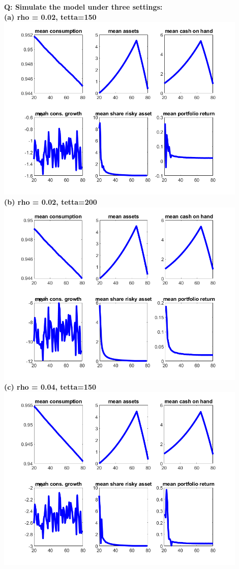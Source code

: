 \documentclass[12pt,a4paper]{article}
\begin{document}
\textbf{Q: Simulate the model under three settings:}\\
\textbf{(a) rho = 0.02, tetta=150}\\
\includegraphics[width = 0.9\textwidth]{PS3/rho0.02tetta150.png}
\\
\textbf{(b) rho = 0.02, tetta=200} \\
\includegraphics[width = 0.9\textwidth]{PS3/rho0.02tetta200.png}
\\
\textbf{(c) rho = 0.04, tetta=150} \\
\includegraphics[width = 0.9\textwidth]{PS3/rho0.04tetta150.png}
\\
\end{document}
